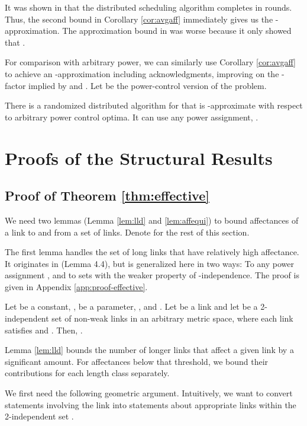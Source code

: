 \documentclass[11pt]{amsart}
\begin{document}
It was shown in \cite{KV10} that the distributed scheduling algorithm completes in  rounds. Thus, the second bound in Corollary \ref{cor:avgaff}
immediately gives us the -approximation. The approximation bound in \cite{KV10} was worse because it only showed that .


For comparison with arbitrary power, we can
similarly use Corollary \ref{cor:avgaff} to achieve an -approximation including acknowledgments,
improving on the -factor 
implied by \cite{KV10} and \cite{SODA11}.
Let  be the power-control version of the problem.

\begin{corollary}
There is a randomized distributed algorithm for  that is
-approximate with respect to
arbitrary power control optima. It can use any  power assignment, .
\end{corollary}


\section{Proofs of the Structural Results}
\label{sec:proofs}
\subsection{Proof of Theorem \ref{thm:effective}}
We need two lemmas (Lemma \ref{lem:lld} and \ref{lem:affequi})
to bound affectances of a link to and from a set of links.
Denote  for the rest of this section.

The first lemma handles the set of long links that have relatively high affectance.
It originates in \cite{us:esa09full} (Lemma 4.4), but is 
generalized here in two ways: To any power assignment , and to
sets with the weaker property of -independence. The proof 
is given in Appendix \ref{app:proof-effective}.




\begin{lemma}
Let  be a constant, ,  be a parameter, , and .  
Let  be a link and 
let  be a 2-independent set of non-weak links in an arbitrary
metric space, where each link  satisfies 
and .
Then, .
\label{lem:lld}
\end{lemma}


Lemma \ref{lem:lld} bounds the number of longer links that affect a
given link by a significant amount. For affectances below that
threshold, we bound their contributions for each length class separately.

We first need the following geometric argument.
Intuitively, we want to convert statements involving the link  
into statements about appropriate links within the 2-independent set .
\end{document}
